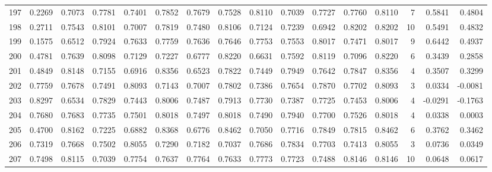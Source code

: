 \begin{tabular}{lrrrrrrrrrrrrrrr}
197 &      0.2269 &  0.7073 &  0.7781 &  0.7401 &  0.7852 &  0.7679 &  0.7528 &  0.8110 &  0.7039 &  0.7727 &   0.7760 &     0.8110 &      7 &                    0.5841 &                     0.4804 \\
198 &      0.2711 &  0.7543 &  0.8101 &  0.7007 &  0.7819 &  0.7480 &  0.8106 &  0.7124 &  0.7239 &  0.6942 &   0.8202 &     0.8202 &     10 &                    0.5491 &                     0.4832 \\
199 &      0.1575 &  0.6512 &  0.7924 &  0.7633 &  0.7759 &  0.7636 &  0.7646 &  0.7753 &  0.7553 &  0.8017 &   0.7471 &     0.8017 &      9 &                    0.6442 &                     0.4937 \\
200 &      0.4781 &  0.7639 &  0.8098 &  0.7129 &  0.7227 &  0.6777 &  0.8220 &  0.6631 &  0.7592 &  0.8119 &   0.7096 &     0.8220 &      6 &                    0.3439 &                     0.2858 \\
201 &      0.4849 &  0.8148 &  0.7155 &  0.6916 &  0.8356 &  0.6523 &  0.7822 &  0.7449 &  0.7949 &  0.7642 &   0.7847 &     0.8356 &      4 &                    0.3507 &                     0.3299 \\
202 &      0.7759 &  0.7678 &  0.7491 &  0.8093 &  0.7143 &  0.7007 &  0.7802 &  0.7386 &  0.7654 &  0.7870 &   0.7702 &     0.8093 &      3 &                    0.0334 &                    -0.0081 \\
203 &      0.8297 &  0.6534 &  0.7829 &  0.7443 &  0.8006 &  0.7487 &  0.7913 &  0.7730 &  0.7387 &  0.7725 &   0.7453 &     0.8006 &      4 &                   -0.0291 &                    -0.1763 \\
204 &      0.7680 &  0.7683 &  0.7735 &  0.7501 &  0.8018 &  0.7497 &  0.8018 &  0.7490 &  0.7940 &  0.7700 &   0.7526 &     0.8018 &      4 &                    0.0338 &                     0.0003 \\
205 &      0.4700 &  0.8162 &  0.7225 &  0.6882 &  0.8368 &  0.6776 &  0.8462 &  0.7050 &  0.7716 &  0.7849 &   0.7815 &     0.8462 &      6 &                    0.3762 &                     0.3462 \\
206 &      0.7319 &  0.7668 &  0.7502 &  0.8055 &  0.7290 &  0.7182 &  0.7037 &  0.7686 &  0.7834 &  0.7703 &   0.7413 &     0.8055 &      3 &                    0.0736 &                     0.0349 \\
207 &      0.7498 &  0.8115 &  0.7039 &  0.7754 &  0.7637 &  0.7764 &  0.7633 &  0.7773 &  0.7723 &  0.7488 &   0.8146 &     0.8146 &     10 &                    0.0648 &                     0.0617 \\

\end{tabular}
